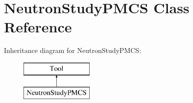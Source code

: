 \hypertarget{classNeutronStudyPMCS}{\section{Neutron\-Study\-P\-M\-C\-S Class Reference}
\label{classNeutronStudyPMCS}
}
Inheritance diagram for Neutron\-Study\-P\-M\-C\-S\-:\begin{figure}[H]
\begin{center}
\leavevmode
\includegraphics[height=2.000000cm]{classNeutronStudyPMCS}
\end{center}
\end{figure}
